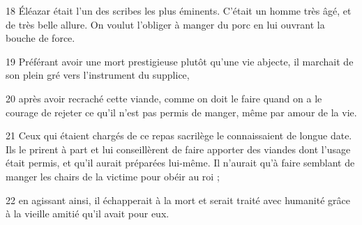 18 Éléazar était l’un des scribes les plus éminents. C’était un homme très âgé, et de très belle allure. On voulut l’obliger à manger du porc en lui ouvrant la bouche de force.

19 Préférant avoir une mort prestigieuse plutôt qu’une vie abjecte, il marchait de son plein gré vers l’instrument du supplice,

20 après avoir recraché cette viande, comme on doit le faire quand on a le courage de rejeter ce qu’il n’est pas permis de manger, même par amour de la vie.

21 Ceux qui étaient chargés de ce repas sacrilège le connaissaient de longue date. Ils le prirent à part et lui conseillèrent de faire apporter des viandes dont l’usage était permis, et qu’il aurait préparées lui-même. Il n’aurait qu’à faire semblant de manger les chairs de la victime pour obéir au roi ;

22 en agissant ainsi, il échapperait à la mort et serait traité avec humanité grâce à la vieille amitié qu’il avait pour eux.

